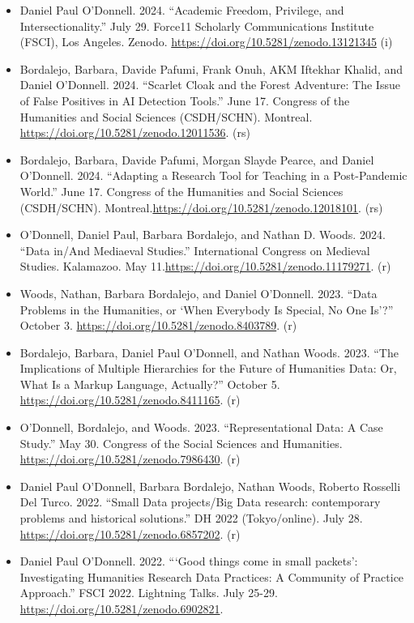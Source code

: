 \documentclass[12pt]{article}
\begin{document}
\begin{itemize}
  \item Daniel Paul O’Donnell. 2024. “Academic Freedom, Privilege, and Intersectionality.” July 29.  Force11 Scholarly Communications Institute (FSCI), Los Angeles. Zenodo. \url{https://doi.org/10.5281/zenodo.13121345} (i)
  \item Bordalejo, Barbara, Davide Pafumi\*, Frank Onuh\*, AKM Iftekhar Khalid\*, and Daniel O’Donnell. 2024. “Scarlet Cloak and the Forest Adventure: The Issue of False Positives in AI Detection Tools.” June 17. Congress of the Humanities and Social Sciences (CSDH/SCHN). Montreal. \url{https://doi.org/10.5281/zenodo.12011536}. (rs)
  \item Bordalejo, Barbara, Davide Pafumi, Morgan Slayde Pearce\*, and Daniel O’Donnell. 2024. “Adapting a Research Tool for Teaching in a Post-Pandemic World.” June 17. Congress of the Humanities and Social Sciences (CSDH/SCHN). Montreal.\url{https://doi.org/10.5281/zenodo.12018101}. (rs)
  \item O’Donnell, Daniel Paul, Barbara Bordalejo, and Nathan D. Woods. 2024. “Data in/And Mediaeval Studies.” International Congress on Medieval Studies. Kalamazoo. May 11.\url{https://doi.org/10.5281/zenodo.11179271}. (r)
  \item Woods, Nathan, Barbara Bordalejo, and Daniel O’Donnell. 2023. “Data Problems in the Humanities, or ‘When Everybody Is Special, No One Is’?” October 3. \url{https://doi.org/10.5281/zenodo.8403789}. (r)
  \item Bordalejo, Barbara, Daniel Paul O’Donnell, and Nathan Woods. 2023. “The Implications of Multiple Hierarchies for the Future of Humanities Data: Or, What Is a Markup Language, Actually?” October 5. \url{https://doi.org/10.5281/zenodo.8411165}. (r)
  \item O’Donnell, Bordalejo, and Woods. 2023. “Representational Data:  A Case Study.” May 30.  Congress of the Social Sciences and Humanities. \url{https://doi.org/10.5281/zenodo.7986430}. (r)
  \item Daniel Paul O’Donnell, Barbara Bordalejo, Nathan Woods, Roberto Rosselli Del Turco. 2022. “Small Data projects/Big Data research: contemporary problems and historical solutions.” DH 2022 (Tokyo/online). July 28. \url{https://doi.org/10.5281/zenodo.6857202}. (r)
  \item Daniel Paul O’Donnell. 2022. “‘Good things come in small packets’: Investigating Humanities Research Data Practices: A Community of Practice Approach.” FSCI 2022. Lightning Talks. July 25-29. \url{https://doi.org/10.5281/zenodo.6902821}.

\end{itemize}
\end{document}
